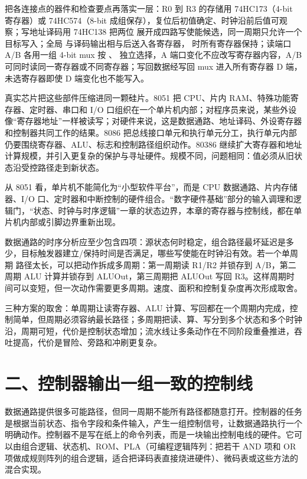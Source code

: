 把各连接点的器件和检查要点再落实一层：R0 到 R3 的存储用 74HC173（4-bit 寄存器）或 74HC574（8-bit 成组保存），复位后初值确定、时钟沿前后值可观察；写地址译码用 74HC138 把两位  展开成四路写使能候选，同一周期只允许一个目标写入；全局  与译码输出相与后送入各寄存器， 时所有寄存器保持；读端口 A/B 各用一组 4-bit mux 按 、 独立选择，A 端口变化不应改写寄存器内容，A/B 可同时读同一寄存器或不同寄存器；写回数据经写回 mux 进入所有寄存器 D 端，未选寄存器即使 D 端变化也不能写入。

真实芯片把这些部件压缩进同一颗硅片。8051 把 CPU、片内 RAM、特殊功能寄存器、定时器、串口和 I/O 口组织在一个单片机内部；对程序员来说，某些外设像“寄存器地址”一样被读写；对硬件来说，这是数据通路、地址译码、外设寄存器和控制器共同工作的结果。8086 把总线接口单元和执行单元分工，执行单元内部仍要围绕寄存器、ALU、标志和控制路径组织动作。80386 继续扩大寄存器和地址计算规模，并引入更复杂的保护与寻址硬件。规模不同，问题相同：值必须从旧状态沿受控路径走到新状态。

\begin{chipcase}
从 8051 看，单片机不能简化为“小型软件平台”，而是 CPU 数据通路、片内存储器、I/O 口、定时器和中断控制的硬件组合。“数字硬件基础”部分的输入调理和逻辑门，“状态、时钟与时序逻辑”一章的状态边界，本章的寄存器与控制线，都在单片机内部或引脚边界重新出现。
\end{chipcase}

数据通路的时序分析应至少包含四项：源状态何时稳定，组合路径最坏延迟是多少，目标触发器建立/保持时间是否满足，哪些写使能在时钟沿有效。若一个单周期  路径太长，可以把动作拆成多周期：第一周期读 R1/R2 并锁存到 A/B，第二周期 ALU 计算并锁存到 ALUOut，第三周期把 ALUOut 写回 R3。这样周期时间可以变短，但一次动作需要更多周期。速度、面积和控制复杂度再次形成取舍。

三种方案的取舍：单周期让读寄存器、ALU 计算、写回都在一个周期内完成，控制简单，但周期必须容纳最长路径；多周期把读、算、写分到多个状态和多个时钟沿，周期可短，代价是控制状态增加；流水线让多条动作在不同阶段重叠推进，吞吐提高，代价是冒险、旁路和冲刷更复杂。

\section{二、控制器输出一组一致的控制线}

数据通路提供很多可能路径，但同一周期不能所有路径都随意打开。控制器的任务是根据当前状态、指令字段和条件输入，产生一组控制信号，让数据通路执行一个明确动作。控制器不是写在纸上的命令列表，而是一块输出控制电线的硬件。它可以由组合逻辑、状态机、ROM、PLA（可编程逻辑阵列：把若干 AND 项和 OR 项做成规则阵列的组合逻辑，适合把译码表直接烧进硬件）、微码表或这些方法的混合实现。

